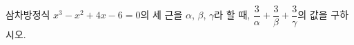 삼차방정식 $x^3-x^2+4x-6=0$의 세 근을 $\alpha$, $\beta$, $\gamma$라 할 때, $\dfrac{3}{\alpha}+\dfrac{3}{\beta}+\dfrac{3}{\gamma}$의 값을 구하시오.
